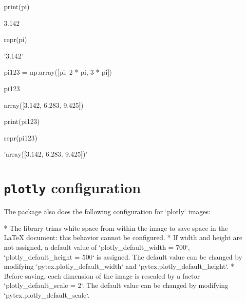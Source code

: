\documentclass[oneside]{book}
\begin{document}
\begin{pycell}
print(pi)
\end{pycell}

\begin{pyexpectedoutput}
3.142
\end{pyexpectedoutput}

\begin{pycell}
repr(pi)
\end{pycell}

\begin{pyexpectedoutput}
'3.142'
\end{pyexpectedoutput}

\begin{pycell}
pi123 = np.array([pi, 2 * pi, 3 * pi])
\end{pycell}

\begin{pycell}
pi123
\end{pycell}

\begin{pyexpectedoutput}
array([3.142, 6.283, 9.425])
\end{pyexpectedoutput}

\begin{pycell}
print(pi123)
\end{pycell}

\begin{pyexpectedoutput}
[3.142 6.283 9.425]
\end{pyexpectedoutput}

\begin{pycell}
repr(pi123)
\end{pycell}

\begin{pyexpectedoutput}
'array([3.142, 6.283, 9.425])'
\end{pyexpectedoutput}

\section{\texttt{plotly} configuration}

\begin{mdcell}
The package also does the following configuration for `plotly` images:

* The library trims white space from within the image to save space in the LaTeX document: this behavior cannot be configured.
* If width and height are not assigned, a default value of `plotly_default_width = 700`, `plotly_default_height = 500` is assigned. The default value can be changed by modifying `pytex.plotly_default_width` and `pytex.plotly_default_height`.
* Before saving, each dimension of the image is rescaled by a factor `plotly_default_scale = 2`. The default value can be changed by modifying `pytex.plotly_default_scale`.
\end{mdcell}
\end{document}

